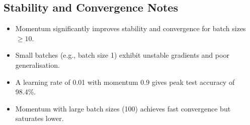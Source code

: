 \documentclass[11pt]{article}
\begin{document}
\subsection{Stability and Convergence Notes}
\begin{itemize}
  \item Momentum significantly improves stability and convergence for batch sizes $\geq 10$.
  \item Small batches (e.g., batch size 1) exhibit unstable gradients and poor generalisation.
  \item A learning rate of 0.01 with momentum 0.9 gives peak test accuracy of 98.4\%.
  \item Momentum with large batch sizes (100) achieves fast convergence but saturates lower.
\end{itemize}
\end{document}
